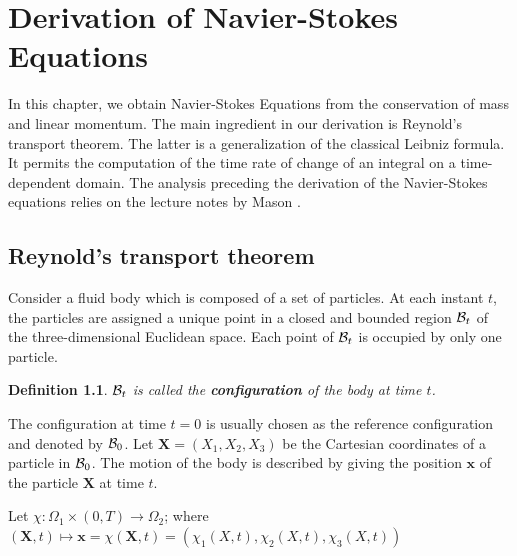 \newtheorem{defi}{Definition}[chapter]

%

\chapter{Derivation of Navier-Stokes Equations}

In this chapter, we obtain Navier-Stokes Equations from the conservation of mass and linear momentum. The main ingredient in our derivation is Reynold's transport theorem. The latter is a generalization of the classical Leibniz formula. It permits the computation of the time rate of change of an integral on a time-dependent domain. The analysis preceding the derivation of the Navier-Stokes equations relies on the lecture notes by Mason \cite{feln,fmln}. 

\section{Reynold's transport theorem}

Consider a fluid body which is composed of a set of particles. At each instant $t$, the particles are assigned a unique point in a closed and bounded region ${\cal B }_{t}$ of the three-dimensional Euclidean space. Each point of ${\cal B }_{t}$ is occupied by only one particle.

\begin{defi}
${\cal B }_{t}$ is called the \textbf{configuration} of the body at time $t$.
\end{defi} 

The configuration at time $t=0$ is usually chosen as the reference configuration and denoted by ${\cal B }_{0}$. Let $\textbf{X} = (X_{1},X_{2},X_{3})$ be the Cartesian coordinates of a particle in ${\cal B }_{0}$. The motion of the body is described by giving the position $\textbf{x}$ of the particle $\textbf{X}$ at time $t$.

Let $ \chi : \Omega_{1} \times(0,T) \longrightarrow \Omega_{2}$; where $(\textbf{X},t) \longmapsto \textbf{x} = \chi (\textbf{X},t) = (\chi_{1}(X,t),\chi_{2}(X,t),\chi_{3}(X,t)) $ 

